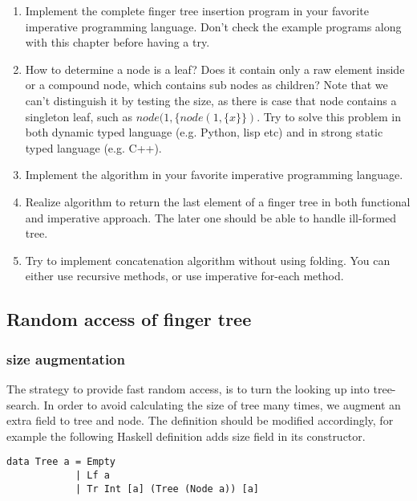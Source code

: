 \documentclass[UTF8]{article}
\begin{document}
\begin{Exercise}
\begin{enumerate}
\item Implement the complete finger tree insertion program in your favorite imperative
programming language. Don't check the example programs along with this chapter before
having a try.

\item How to determine a node is a leaf? Does it contain only a raw element inside or a compound
node, which contains sub nodes as children? Note that we can't distinguish it by testing
the size, as there is case that node contains a singleton leaf, such as $node(1, \{node(1, \{x\}\})$.
Try to solve this problem in both dynamic typed language (e.g. Python, lisp etc) and
in strong static typed language (e.g. C++).

\item Implement the  algorithm in your favorite imperative programming
language.

\item Realize algorithm to return the last element of a finger tree in both functional and
imperative approach. The later one should be able to handle ill-formed tree.

\item Try to implement concatenation algorithm without using folding. You can either use
recursive methods, or use imperative for-each method.
\end{enumerate}
\end{Exercise}

\subsection{Random access of finger tree}

\subsubsection{size augmentation}
The strategy to provide fast random access, is to turn the looking up into tree-search.
In order to avoid calculating the size of tree many times, we augment an extra field
to tree and node. The definition should be modified accordingly, for example the
following Haskell definition adds size field in its constructor.

\lstset{language=Haskell}
\begin{lstlisting}
data Tree a = Empty
            | Lf a
            | Tr Int [a] (Tree (Node a)) [a]
\end{lstlisting}
\end{document}
